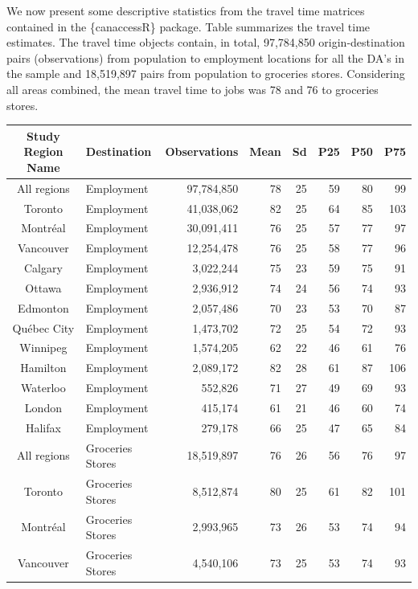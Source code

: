 \documentclass[Royal,times,sageh]{sagej}
\begin{document}
We now present some descriptive statistics from the travel time matrices
contained in the \{canaccessR\} package. Table \citet{tbl-table_1}
summarizes the travel time estimates. The travel time objects contain,
in total, 97,784,850 origin-destination pairs (observations) from
population to employment locations for all the DA's in the sample and
18,519,897 pairs from population to groceries stores. Considering all
areas combined, the mean travel time to jobs was 78 and 76 to groceries
stores.

\begingroup
\setlength{}
\setlength{}\fontsize{7.5pt}{9.0pt}\selectfont
\begin{longtable}{@{\extracolsep{\fill}}clrrrrrr}
\toprule
Study Region Name & Destination & Observations & Mean & Sd & P25 & P50 & P75 \\ 
\midrule\addlinespace[2.5pt]
All regions & Employment & 97,784,850 & 78 & 25 & 59 & 80 & 99 \\ 
Toronto & Employment & 41,038,062 & 82 & 25 & 64 & 85 & 103 \\ 
Montréal & Employment & 30,091,411 & 76 & 25 & 57 & 77 & 97 \\ 
Vancouver & Employment & 12,254,478 & 76 & 25 & 58 & 77 & 96 \\ 
Calgary & Employment & 3,022,244 & 75 & 23 & 59 & 75 & 91 \\ 
Ottawa & Employment & 2,936,912 & 74 & 24 & 56 & 74 & 93 \\ 
Edmonton & Employment & 2,057,486 & 70 & 23 & 53 & 70 & 87 \\ 
Québec City & Employment & 1,473,702 & 72 & 25 & 54 & 72 & 93 \\ 
Winnipeg & Employment & 1,574,205 & 62 & 22 & 46 & 61 & 76 \\ 
Hamilton & Employment & 2,089,172 & 82 & 28 & 61 & 87 & 106 \\ 
Waterloo & Employment & 552,826 & 71 & 27 & 49 & 69 & 93 \\ 
London & Employment & 415,174 & 61 & 21 & 46 & 60 & 74 \\ 
Halifax & Employment & 279,178 & 66 & 25 & 47 & 65 & 84 \\ 
All regions & Groceries Stores & 18,519,897 & 76 & 26 & 56 & 76 & 97 \\ 
Toronto & Groceries Stores & 8,512,874 & 80 & 25 & 61 & 82 & 101 \\ 
Montréal & Groceries Stores & 2,993,965 & 73 & 26 & 53 & 74 & 94 \\ 
Vancouver & Groceries Stores & 4,540,106 & 73 & 25 & 53 & 74 & 93 \\ 

\end{longtable}
\end{document}
